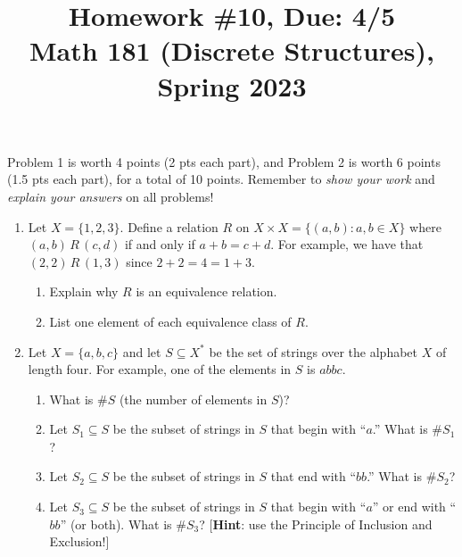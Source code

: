 \documentclass[11pt]{article}
\title{Homework \#10, Due: 4/5 \\Math 181 (Discrete Structures), Spring 2023}
\date{}
\begin{document}
\maketitle

\thispagestyle{empty}

\vspace{-1cm}

Problem 1 is worth 4 points (2 pts each part), and Problem 2 is worth 6 points (1.5 pts each part), for a total of 10 points. Remember to \emph{show your work} and \emph{explain your answers} on all problems!

\begin{enumerate}

\item Let $X= \{1,2,3\}$. Define a relation $R$ on $X \times X = \{(a,b)\colon a, b\in X\}$ where $(a,b) \, R \, (c,d)$ if and only if $a+b = c+d$. For example, we have that $(2,2) \, R \, (1,3)$ since $2+2=4=1+3$.
\begin{enumerate}
\item Explain why $R$ is an equivalence relation.
\item List one element of each equivalence class of $R$.
\end{enumerate}

\item Let $X = \{a,b,c\}$ and let $S\subseteq X^{*}$ be the set of strings over the alphabet $X$ of length four. For example, one of the elements in $S$ is $abbc$.
\begin{enumerate}
\item What is $\#S $ (the number of elements in $S$)?
\item Let $S_1 \subseteq S$ be the subset of strings in $S$ that begin with ``$a$.'' What is $\#S_1$?
\item Let $S_2 \subseteq S$ be the subset of strings in $S$ that end with ``$bb$.'' What is $\#S_2$?
\item Let $S_3 \subseteq S$ be the subset of strings in $S$ that begin with ``$a$'' or end with ``$bb$'' (or both). What is $\#S_3$? [{\bf Hint}: use the Principle of Inclusion and Exclusion!]
\end{enumerate}

\end{enumerate}
\end{document}
